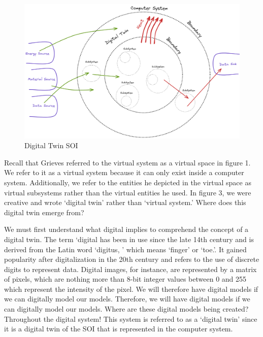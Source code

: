 \documentclass[9pt,conference]{IEEEtran}
\begin{document}
    \begin{figure}[htbp]
        \includegraphics[width=\columnwidth]{DT SOI.png}
        \caption{Digital Twin SOI}
        \label{DTSOI}
    \end{figure}

    Recall that Grieves referred to the virtual system as a virtual space in figure 1. 
    We refer to it as a virtual system because it can only exist inside a computer system. 
    Additionally, we refer to the entities he depicted in the virtual space as virtual subsystems rather than the virtual entities he used. In figure 3, 
    we were creative and wrote `digital twin'  rather than `virtual system.'  Where does this digital twin emerge from?

    We must first understand what digital implies to comprehend the concept of a digital twin.  
    The term `digital has been in use since the late 14th century and is derived from the Latin word `digitus, ' 
    which means `finger'  or `toe.'. It gained popularity after digitalization in the 20th century and refers to the use of discrete digits to represent data. 
    Digital images, for instance, are represented by a matrix of pixels, which are nothing more than 8-bit integer values between 0 and 255 which represent the intensity 
    of the pixel. 
    We will therefore have digital models if we can digitally model our models. 
    Therefore, we will have digital models if we can digitally model our models. Where are these digital models being created? Throughout the digital system! 
    This system is referred to as a `digital twin'  since it is a digital twin of the SOI that is represented in the computer system.
\end{document}
